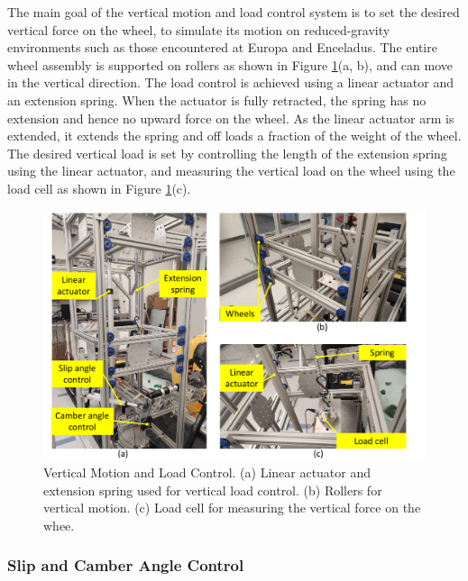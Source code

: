 \documentclass{article}
\begin{document}
The main goal of the vertical motion and load control system is to set the desired vertical force on the wheel, to simulate its motion on reduced-gravity environments such as those encountered at Europa and Enceladus. The entire wheel assembly is supported on rollers as shown in Figure \ref{fig:load-control}(a, b), and can move in the vertical direction. The load control is achieved using a linear actuator and an extension spring. When the actuator is fully retracted, the spring has no extension and hence no upward force on the wheel. As the linear actuator arm is extended, it extends the spring and off loads a fraction of the weight of the wheel. The desired vertical load is set by controlling the length of the extension spring using the linear actuator, and measuring the vertical load on the wheel using the load cell as shown in Figure \ref{fig:load-control}(c).

\begin{figure}[hbt!]
\centering
\includegraphics[width=6.50in]{test-rig-images/load-control.pdf}
\caption{Vertical Motion and Load Control. (a) Linear actuator and extension spring used for vertical load control. (b) Rollers for vertical motion. (c) Load cell for measuring the vertical force on the whee. }
\label{fig:load-control}
\end{figure}



\subsubsection{Slip and Camber Angle Control}
\label{subsubsec:slip-camber-control}
\end{document}
